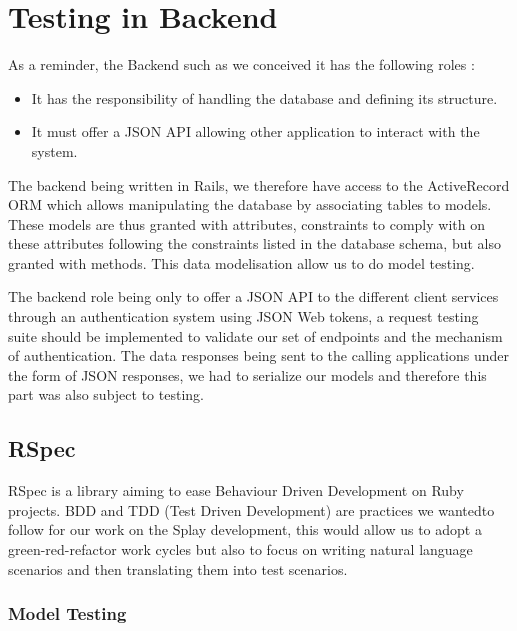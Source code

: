 \documentclass{eplmastersthesis}
\begin{document}
    \section{Testing in Backend}

      As a reminder, the Backend such as we conceived it has the following
      roles :

      \begin{itemize}
        \item It has the responsibility of handling the database and
        defining its structure.
        \item It must offer a JSON API allowing other application to interact
        with the system.
      \end{itemize}

      The backend being written in Rails, we therefore have access to the
      ActiveRecord ORM which allows manipulating the database by associating
      tables to models. These models are thus granted with attributes,
      constraints to comply with on these attributes following the constraints
      listed in the database schema, but also granted with methods. This data
      modelisation allow us to do model testing.

      The backend role being only to offer a JSON API to the different client
      services through an authentication system using JSON Web tokens, a
      request testing suite should be implemented to validate our set of
      endpoints and the mechanism of authentication.
      The data responses being sent to the calling applications under the form
      of JSON responses, we had to serialize our models and therefore this
      part was also subject to testing.

      \subsection{RSpec}

        RSpec \cite{rspec} is a library aiming to ease Behaviour Driven
        Development on Ruby projects. BDD and TDD (Test Driven Development) are
        practices we wantedto follow for our work on the Splay development,
        this would allow us to adopt a green-red-refactor work cycles but also
        to focus on writing natural language scenarios and then translating
        them into test scenarios.

        \subsubsection{Model Testing}
\end{document}
